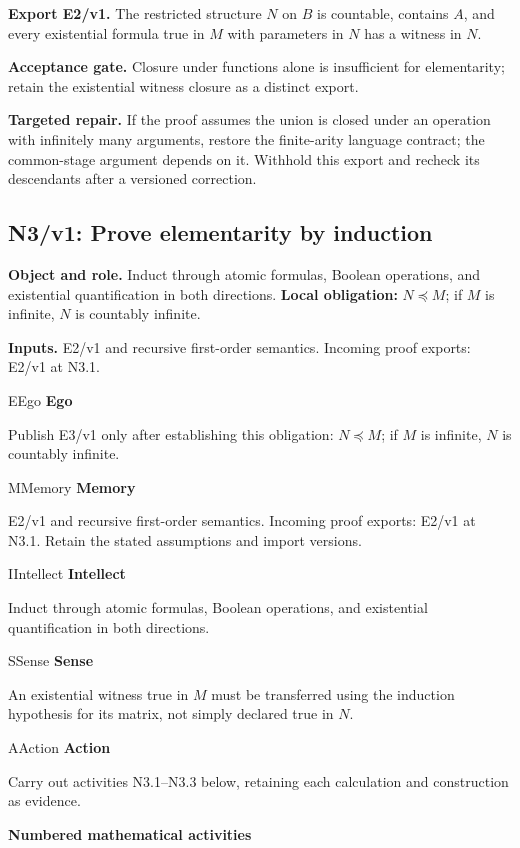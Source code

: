 \documentclass[preprint,12pt,aps,pra,showkeys,amsmath,amssymb,superscriptaddress,floatfix]{revtex4-2}
\theoremstyle{definition}
\theoremstyle{remark}
\newcommand{\mmfaculty}[3]{%
 \begin{mmfacultybox}{#1}{#2}
 {\sffamily\bfseries\color{MMBlue}#2}\par\smallskip #3
 \end{mmfacultybox}}
\newcommand{\field}[2]{\par\smallskip\noindent\textbf{#1.} #2\par}
\begin{document}
\field{Export E2/v1}{The restricted structure \(N\) on \(B\) is countable, contains \(A\),
and every existential formula true in \(M\) with parameters in \(N\) has
a witness in \(N\).}

\field{Acceptance gate}{Closure under functions alone is insufficient for elementarity; retain
the existential witness closure as a distinct export.}

\field{Targeted repair}{If the proof assumes the union is closed under an operation with
infinitely many arguments, restore the finite-arity language contract;
the common-stage argument depends on it. Withhold this export and
recheck its descendants after a versioned correction.}

\clearpage

\begingroup\footnotesize\linespread{1.05}\selectfont\let\small\footnotesize

\subsection{N3/v1: Prove elementarity by induction}

\field{Object and role}{Induct through atomic formulas, Boolean operations, and existential
quantification in both directions. \textbf{Local obligation:}
\(N\preccurlyeq M\); if \(M\) is infinite, \(N\) is countably infinite.}

\field{Inputs}{E2/v1 and recursive first-order semantics. Incoming proof exports: E2/v1
at N3.1.}

\mmfaculty{E}{Ego}{Publish E3/v1 only after establishing this obligation:
\(N\preccurlyeq M\); if \(M\) is infinite, \(N\) is countably infinite.}

\mmfaculty{M}{Memory}{E2/v1 and recursive first-order semantics. Incoming proof exports: E2/v1
at N3.1. Retain the stated assumptions and import versions.}

\mmfaculty{I}{Intellect}{Induct through atomic formulas, Boolean operations, and existential
quantification in both directions.}

\mmfaculty{S}{Sense}{An existential witness true in \(M\) must be transferred using the
induction hypothesis for its matrix, not simply declared true in \(N\).}

\mmfaculty{A}{Action}{Carry out activities N3.1--N3.3 below, retaining each calculation and
construction as evidence.}

\smallskip\noindent\textbf{Numbered mathematical activities}
\end{document}
